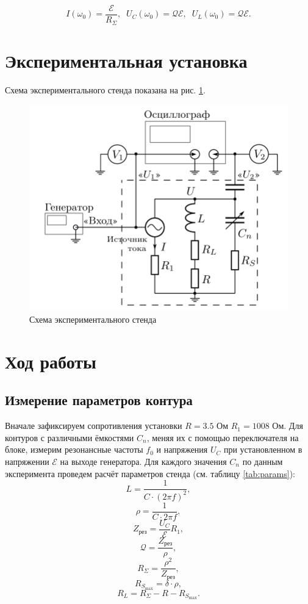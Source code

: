 \documentclass[12pt,a4paper]{article}
\begin{document}
    \begin{equation}
        I(\omega_0) = \frac{\mathscr{E}}{R_{\Sigma}},\;\; U_C(\omega_0) = \mathcal{Q} \mathscr{E}, \;\; U_L(\omega_0) = \mathcal{Q} \mathscr{E}.
    \end{equation}

	\section*{Экспериментальная установка}

    Схема экспериментального стенда показана на рис. \ref{fig:scheme}.
    
    \begin{figure}[H]
    	\centering
    	\includegraphics[scale = 0.4]{res/scheme.png}
    	\caption{Схема экспериментального стенда}
    	\label{fig:scheme}
    \end{figure}
    
   
   
   
\section*{Ход работы}

\subsection*{Измерение параметров контура}
Вначале зафиксируем сопротивления установки $R=3.5$ Ом $R_1=1008$ Ом. Для контуров с различными ёмкостями $C_n$, меняя их с помощью переключателя на блоке, измерим резонансные частоты $f_0$ и напряжения $U_C$ при установленном в напряжении $\mathscr{E}$ на выходе генератора. Для каждого значения $C_n$ по данным эксперимента проведем расчёт параметров стенда (см. таблицу \ref{tab:params}): $$L=\frac{1}{C\cdot(2\pi f)^2},$$ $$\rho=\frac{1}{C\cdot 2\pi f},$$ $$Z_{\text{рез}}=\frac{U_C}{\mathscr{E}}R_1,$$  $$\mathcal{Q}=\frac{Z_{\text{рез}}}{\rho},$$ $$R_{\Sigma}=\frac{\rho^2}{Z_{\text{рез}}},$$   $$R_{S_{\text{max}}}=\delta \cdot \rho,$$ $$R_L=R_{\Sigma}-R-R_{S_{\text{max}}}.$$
\end{document}
